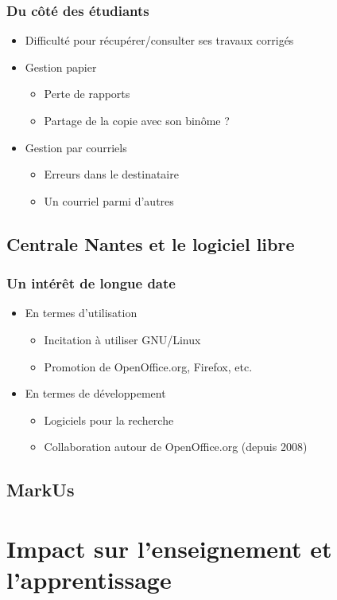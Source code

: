 \documentclass[hyperref,french,usenames,xcolor=dvipsnames]{beamer}
\begin{document}
\frame
{
  \frametitle{Du côté des étudiants}

\begin{itemize}
\item Difficulté pour récupérer/consulter ses travaux corrigés
\item Gestion papier
\begin{itemize}
\item Perte de rapports
\item Partage de la copie avec son binôme ?
\end{itemize}
\item Gestion par courriels
\begin{itemize}
\item Erreurs dans le destinataire
\item Un courriel parmi d'autres
\end{itemize}
\end{itemize}
}

\subsection*{Centrale Nantes et le logiciel libre}

\frame
{
  \frametitle{Un intérêt de longue date}

\begin{itemize}
\item En termes d'utilisation
\begin{itemize}
\item Incitation à utiliser GNU/Linux
\item Promotion de OpenOffice.org, Firefox, etc.
\end{itemize}
\item En termes de développement
\begin{itemize}
\item Logiciels pour la recherche
\item Collaboration autour de OpenOffice.org (depuis 2008)
\end{itemize}
\end{itemize}
}

\subsection*{MarkUs}


\section*{Impact sur l'enseignement et l'apprentissage}
\end{document}
